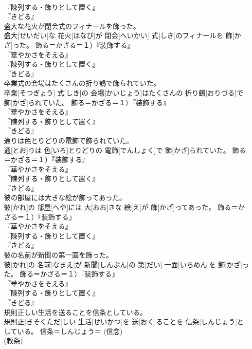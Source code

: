 \documentclass[8pt]{extreport}
\begin{document}
\begin{CJK}{UTF8}{min}
{\\	『陳列する・飾りとして置く』
\\	『きどる』
\\	盛大な花火が閉会式のフィナールを飾った。	
\\	盛大[せいだい]な 花火[はなび]が 閉会[へいかい] 式[しき]のフィナールを 飾[かざ]った。	飾る＝かざる＝１）『装飾する』
\\	『華やかさをそえる』 　　　　　　　
\\	『陳列する・飾りとして置く』
\\	『きどる』
\\	卒業式の会場はたくさんの折り鶴で飾られていた。	
\\	卒業[そつぎょう] 式[しき]の 会場[かいじょう]はたくさんの 折り鶴[おりづる]で 飾[かざ]られていた。	飾る＝かざる＝１）『装飾する』
\\	『華やかさをそえる』 　　　　　　　
\\	『陳列する・飾りとして置く』
\\	『きどる』
\\	通りは色とりどりの電飾で飾られていた。	
\\	通[とお]りは 色[いろ]とりどりの 電飾[でんしょく]で 飾[かざ]られていた。	飾る＝かざる＝１）『装飾する』
\\	『華やかさをそえる』 　　　　　　　
\\	『陳列する・飾りとして置く』
\\	『きどる』
\\	彼の部屋には大きな絵が飾ってあった。	
\\	彼[かれ]の 部屋[へや]には 大[おお]きな 絵[え]が 飾[かざ]ってあった。	飾る＝かざる＝１）『装飾する』
\\	『華やかさをそえる』 　　　　　　　
\\	『陳列する・飾りとして置く』
\\	『きどる』
\\	彼の名前が新聞の第一面を飾った。	
\\	彼[かれ]の 名前[なまえ]が 新聞[しんぶん]の 第[だい] 一面[いちめん]を 飾[かざ]った。	飾る＝かざる＝１）『装飾する』
\\	『華やかさをそえる』 　　　　　　　
\\	『陳列する・飾りとして置く』
\\	『きどる』
\\	規則正しい生活を送ることを信条としている。	
\\	規則正[きそくただ]しい 生活[せいかつ]を 送[おく]ることを 信条[しんじょう]としている。	信条＝しんじょう＝ (信念) 
\\	(教条) 
}
\end{CJK}
\end{document}
